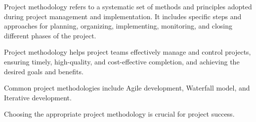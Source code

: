 
Project methodology refers to a systematic set of methods
and principles adopted during project management and implementation.
It includes specific steps and approaches 
for planning, organizing, implementing, monitoring, 
and closing different phases of the project.

Project methodology helps project teams effectively manage 
and control projects, ensuring timely, high-quality, 
and cost-effective completion, and achieving the desired goals and benefits. 

Common project methodologies 
include Agile development, Waterfall model, and Iterative development.

Choosing the appropriate project methodology is crucial for project success.
